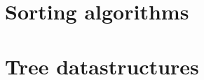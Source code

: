 \begin{appendices}

    \section{Sorting algorithms}

    

    

    

    

    \section{Tree datastructures}

    

    

    

    

\end{appendices}
